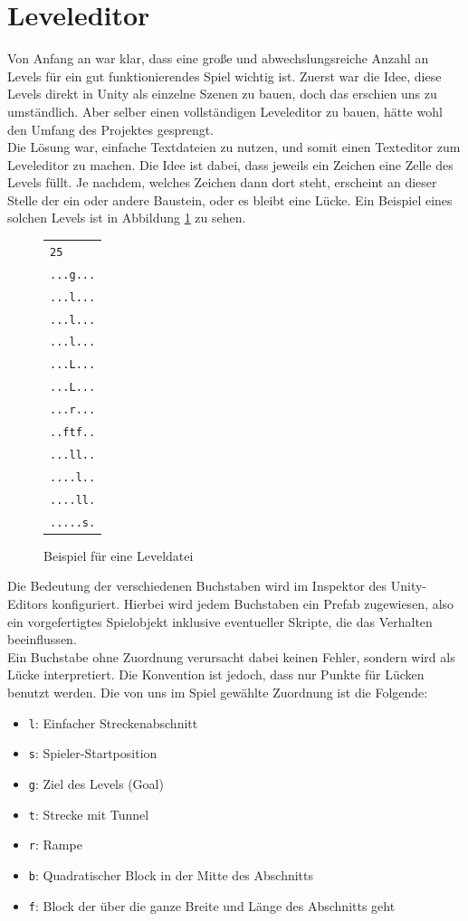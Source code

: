 \section{Leveleditor}
Von Anfang an war klar, dass eine große und abwechslungsreiche Anzahl an Levels für ein gut funktionierendes Spiel wichtig ist. Zuerst war die Idee, diese Levels direkt in Unity als einzelne Szenen zu bauen, doch das erschien uns zu umständlich. Aber selber einen vollständigen Leveleditor zu bauen, hätte wohl den Umfang des Projektes gesprengt.\\
Die Lösung war, einfache Textdateien zu nutzen, und somit einen Texteditor zum Leveleditor zu machen. Die Idee ist dabei, dass jeweils ein Zeichen eine Zelle des Levels füllt. Je nachdem, welches Zeichen dann dort steht, erscheint an dieser Stelle der ein oder andere Baustein, oder es bleibt eine Lücke. Ein Beispiel eines solchen Levels ist in Abbildung \ref{Leveldatei} zu sehen.\\
\begin{figure}
\centering
\begin{tabular}{|l|}
\hline
\texttt{25}\\
\texttt{...g...}\\
\texttt{...l...}\\
\texttt{...l...}\\
\texttt{...l...}\\
\texttt{...L...}\\
\texttt{...L...}\\
\texttt{...r...}\\
\texttt{..ftf..}\\
\texttt{...ll..}\\
\texttt{....l..}\\
\texttt{....ll.}\\
\texttt{.....s.}\\
\hline
\end{tabular}
\caption{Beispiel für eine Leveldatei}
\label{Leveldatei}
\end{figure}
Die Bedeutung der verschiedenen Buchstaben wird im Inspektor des Unity-Editors konfiguriert. Hierbei wird jedem Buchstaben ein Prefab zugewiesen, also ein vorgefertigtes Spielobjekt inklusive eventueller Skripte, die das Verhalten beeinflussen.\\
Ein Buchstabe ohne Zuordnung verursacht dabei keinen Fehler, sondern wird als Lücke interpretiert. Die Konvention ist jedoch, dass nur Punkte für Lücken benutzt werden. Die von uns im Spiel gewählte Zuordnung ist die Folgende:
\begin{itemize}
\item \texttt{l}: Einfacher Streckenabschnitt
\item \texttt{s}: Spieler-Startposition
\item \texttt{g}: Ziel des Levels (Goal)
\item \texttt{t}: Strecke mit Tunnel
\item \texttt{r}: Rampe
\item \texttt{b}: Quadratischer Block in der Mitte des Abschnitts
\item \texttt{f}: Block der über die ganze Breite und Länge des Abschnitts geht
\end{itemize}

